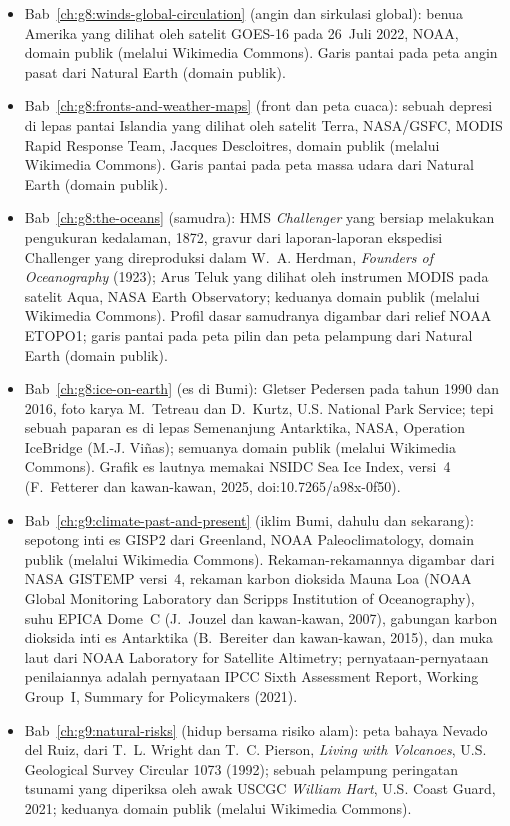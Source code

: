 \begin{itemize}
  \item Bab~\ref{ch:g8:winds-global-circulation} (angin dan sirkulasi global): benua Amerika yang dilihat oleh satelit GOES-16 pada 26~Juli 2022, NOAA, domain publik (melalui Wikimedia Commons). Garis pantai pada peta angin pasat dari Natural Earth (domain publik).
  \item Bab~\ref{ch:g8:fronts-and-weather-maps} (front dan peta cuaca): sebuah depresi di lepas pantai Islandia yang dilihat oleh satelit Terra, NASA/GSFC, MODIS Rapid Response Team, Jacques Descloitres, domain publik (melalui Wikimedia Commons). Garis pantai pada peta massa udara dari Natural Earth (domain publik).
  \item Bab~\ref{ch:g8:the-oceans} (samudra): HMS \emph{Challenger} yang bersiap melakukan pengukuran kedalaman, 1872, gravur dari laporan-laporan ekspedisi Challenger yang direproduksi dalam W.~A. Herdman, \emph{Founders of Oceanography} (1923); Arus Teluk yang dilihat oleh instrumen MODIS pada satelit Aqua, NASA Earth Observatory; keduanya domain publik (melalui Wikimedia Commons). Profil dasar samudranya digambar dari relief NOAA ETOPO1; garis pantai pada peta pilin dan peta pelampung dari Natural Earth (domain publik).
  \item Bab~\ref{ch:g8:ice-on-earth} (es di Bumi): Gletser Pedersen pada tahun 1990 dan 2016, foto karya M.~Tetreau dan D.~Kurtz, U.S. National Park Service; tepi sebuah paparan es di lepas Semenanjung Antarktika, NASA, Operation IceBridge (M.-J. Viñas); semuanya domain publik (melalui Wikimedia Commons). Grafik es lautnya memakai NSIDC Sea Ice Index, versi~4 (F.~Fetterer dan kawan-kawan, 2025, doi:10.7265/a98x-0f50).
  \item Bab~\ref{ch:g9:climate-past-and-present} (iklim Bumi, dahulu dan sekarang): sepotong inti es GISP2 dari Greenland, NOAA Paleoclimatology, domain publik (melalui Wikimedia Commons). Rekaman-rekamannya digambar dari NASA GISTEMP versi~4, rekaman karbon dioksida Mauna Loa (NOAA Global Monitoring Laboratory dan Scripps Institution of Oceanography), suhu EPICA Dome~C (J.~Jouzel dan kawan-kawan, 2007), gabungan karbon dioksida inti es Antarktika (B.~Bereiter dan kawan-kawan, 2015), dan muka laut dari NOAA Laboratory for Satellite Altimetry; pernyataan-pernyataan penilaiannya adalah pernyataan IPCC Sixth Assessment Report, Working Group~I, Summary for Policymakers (2021).
  \item Bab~\ref{ch:g9:natural-risks} (hidup bersama risiko alam): peta bahaya Nevado del Ruiz, dari T.~L. Wright dan T.~C. Pierson, \emph{Living with Volcanoes}, U.S. Geological Survey Circular 1073 (1992); sebuah pelampung peringatan tsunami yang diperiksa oleh awak USCGC \emph{William Hart}, U.S. Coast Guard, 2021; keduanya domain publik (melalui Wikimedia Commons).

\end{itemize}
